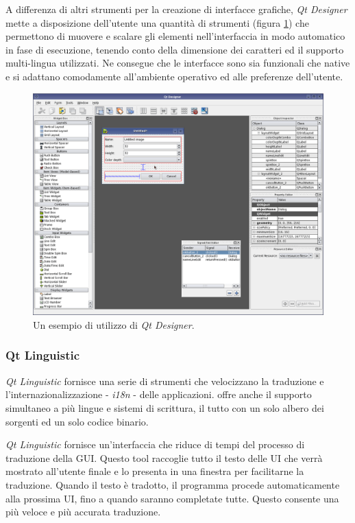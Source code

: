 A differenza di altri strumenti per la creazione di interfacce grafiche, \emph{Qt Designer} mette a disposizione dell'utente una quantità di strumenti (figura \ref{figura:qtdesigner}) che permettono di muovere e scalare gli elementi nell'interfaccia in modo automatico in fase di esecuzione, tenendo conto della dimensione dei caratteri ed il supporto multi-lingua utilizzati. Ne consegue che le interfacce sono sia funzionali che native e si adattano comodamente all'ambiente operativo ed alle preferenze dell'utente.

\begin{figure}[!htb]
	\centering
	\includegraphics[width=12cm]{images/qtdesigner.png}
	\caption{Un esempio di utilizzo di \emph{Qt Designer}.}
	\label{figura:qtdesigner}
\end{figure}


\subsubsection{Qt Linguistic}
\emph{Qt Linguistic} fornisce una serie di strumenti che velocizzano la traduzione e l'internazionalizzazione - \emph{i18n} - delle applicazioni. \qt{} offre anche il supporto simultaneo a più lingue e sistemi di scrittura, il tutto con un solo albero dei sorgenti ed un solo codice binario.

\emph{Qt Linguistic} fornisce un'interfaccia che riduce di tempi del processo di traduzione della GUI. Questo tool raccoglie tutto il testo delle UI che verrà mostrato all'utente finale e lo presenta in una finestra per facilitarne la traduzione. Quando il testo è tradotto, il programma procede automaticamente alla prossima UI, fino a quando saranno completate tutte. Questo consente una più veloce e più accurata traduzione.

